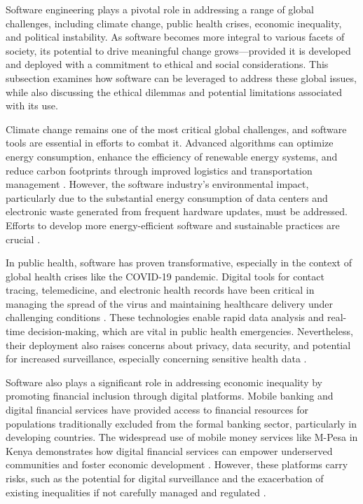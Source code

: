 \begin{refsection}
Software engineering plays a pivotal role in addressing a range of global challenges, including climate change, public health crises, economic inequality, and political instability. As software becomes more integral to various facets of society, its potential to drive meaningful change grows—provided it is developed and deployed with a commitment to ethical and social considerations. This subsection examines how software can be leveraged to address these global issues, while also discussing the ethical dilemmas and potential limitations associated with its use.

Climate change remains one of the most critical global challenges, and software tools are essential in efforts to combat it. Advanced algorithms can optimize energy consumption, enhance the efficiency of renewable energy systems, and reduce carbon footprints through improved logistics and transportation management \cite[pp.~97-99]{fuchs2014digital}. However, the software industry's environmental impact, particularly due to the substantial energy consumption of data centers and electronic waste generated from frequent hardware updates, must be addressed. Efforts to develop more energy-efficient software and sustainable practices are crucial \cite[pp.~45-48]{masanet2020energy}.

In public health, software has proven transformative, especially in the context of global health crises like the COVID-19 pandemic. Digital tools for contact tracing, telemedicine, and electronic health records have been critical in managing the spread of the virus and maintaining healthcare delivery under challenging conditions \cite[pp.~106-108]{whitelaw2020digitalhealth}. These technologies enable rapid data analysis and real-time decision-making, which are vital in public health emergencies. Nevertheless, their deployment also raises concerns about privacy, data security, and potential for increased surveillance, especially concerning sensitive health data \cite[pp.~76-78]{zuboff2020age}.

Software also plays a significant role in addressing economic inequality by promoting financial inclusion through digital platforms. Mobile banking and digital financial services have provided access to financial resources for populations traditionally excluded from the formal banking sector, particularly in developing countries. The widespread use of mobile money services like M-Pesa in Kenya demonstrates how digital financial services can empower underserved communities and foster economic development \cite[pp.~2-4]{jack2010economics}. However, these platforms carry risks, such as the potential for digital surveillance and the exacerbation of existing inequalities if not carefully managed and regulated \cite[pp.~51-53]{fuchs2014digital}.


\end{refsection}
